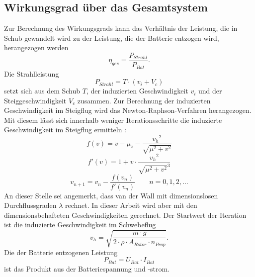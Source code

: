 \subsection{Wirkungsgrad über das Gesamtsystem}
Zur Berechnung des Wirkungsgrads kann das Verhältnis der Leistung, die in Schub gewandelt wird zu der Leistung, die der Batterie entzogen wird, herangezogen werden
\begin{equation}
	\eta_{ges} = \frac{P_{Strahl}}{P_{Bat}}.
\end{equation}
Die Strahlleistung 
\begin{equation}
	P_{Strahl} = T\cdot (v_i + V_c)
\end{equation}
setzt sich aus dem Schub \ensuremath{T}, der induzierten Geschwindigkeit \ensuremath{v_i} und der Steiggeschwindigkeit \ensuremath{V_c} zusammen.
Zur Berechnung der induzierten Geschwindigkeit im Steigflug wird das Newton-Raphson-Verfahren herangezogen. Mit diesem lässt sich innerhalb weniger Iterationsschritte die induzierte Geschwindigkeit im Steigflug ermitteln \cite[S.153]{Wall.2015}:
\begin{equation}
	f(v) = v-\mu_z-\frac{{v_h}^2}{\sqrt{\mu^2+v^2}}
\end{equation}
\begin{equation}
	f'(v) = 1 + v\cdot\frac{{v_h}^2}{\sqrt{\mu^2+v^2}^3}
\end{equation}
\begin{equation}
	v_{n+1} = v_n - \frac{f(v_n)}{f'(v_n)}\qquad n = 0,1,2,\dots
\end{equation}
An dieser Stelle sei angemerkt, dass van der Wall mit dimensionslosen Durchflussgraden \ensuremath{\lambda} rechnet. In dieser Arbeit wird aber mit den dimensionsbehafteten Geschwindigkeiten gerechnet.
Der Startwert der Iteration ist die induzierte Geschwindigkeit im Schwebeflug
\begin{equation}
	v_h = \sqrt{\frac{m\cdot g}{2\cdot\rho\cdot A_{Rotor}\cdot n_{Prop}}}.
\end{equation}
Die der Batterie entzogenen Leistung
\begin{equation}
	P_{Bat} = U_{Bat}\cdot I_{Bat}
\end{equation}
ist das Produkt aus der Batteriespannung und -strom.


